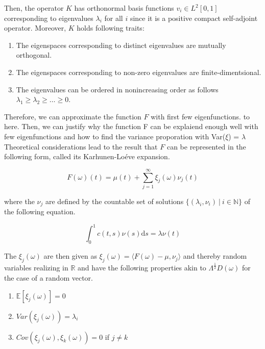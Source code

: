 \documentclass[11pt,twoside,a4paper]{article}
\begin{document}
	Then, the operator $K$ has orthonormal basis functions $v_{i} \in L^{2}[0,1]$ corresponding to eigenvalues $\lambda_{i}$ for all $i$ since it is a positive compact self-adjoint operator. Moreover, $K$ holds following traits:
	
		\begin{enumerate}
			\item The eigenspaces corresponding to distinct eigenvalues are mutually orthogonal.
			\item The eigenspaces corresponding to non-zero eigenvalues are finite-dimentsional.
			\item The eigenvalues can be ordered in nonincreasing order as follows $\lambda_{1} \geq \lambda_{2} \geq \dots \geq 0$.
		\end{enumerate}
	
	Therefore, we can approximate the function $F$ with first few eigenfunctions. {\color{orange}to here. Then, we can justify why the function F can be explaiend enough well with few eigenfunctions and how to find the variance proporation with Var($\xi$) = $\lambda$}
	Theoretical considerations lead to the result that $F$ can be represented in the following form, called its Karhunen-Lo\'{e}ve expansion.
	
	\begin{equation}\label{KarhunenLoeve}
		F(\omega)(t) = \mu(t) + \sum_{j = 1}^{\infty} \xi_j(\omega) \nu_j(t)
	\end{equation}

	where the $\nu_j$ are defined by the countable set of solutions $\{(\lambda_i, \nu_i) \: \vert \: i \in \mathbb{N}\}$ of the following equation.
	
	\begin{equation}
		\int_{0}^{1}c(t,s)\nu(s) \mathrm{d}s = \lambda \nu(t)
	\end{equation}
	
	The $\xi_j(\omega)$ are then given as $\xi_j(\omega) = \langle F(\omega) - \mu, \nu_j\rangle$ and thereby random variables realizing in $\mathbb{R}$ and have the following properties akin to $\Lambda^{\frac{1}{2}} D(\omega)$ for the case of a random vector.
	
	\begin{multicols}{2}
		\begin{enumerate}
			\item $\mathbb{E}\left[\xi_j(\omega)\right] = 0$
			\item $Var\left(\xi_j(\omega)\right) = \lambda_i$
			\item $Cov\left(\xi_j(\omega), \xi_k(\omega)\right) = 0$ if $j \neq k$
		\end{enumerate}
	\end{multicols}
	
\end{document}
